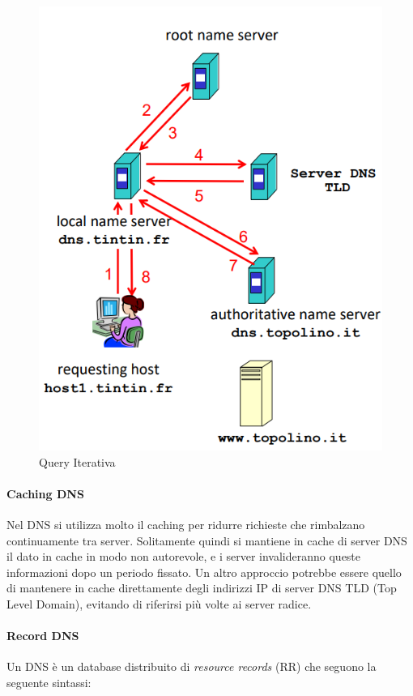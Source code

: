 \documentclass{article}
\begin{document}
\begin{figure}[htbp]
\begin{minipage}{0.37\textwidth}
        \includegraphics[width=\linewidth]{img/queryIterativa.png}
        \caption{Query Iterativa}
    \end{minipage}
\end{figure}

\newpage

\paragraph{Caching DNS} Nel DNS si utilizza molto il caching per ridurre richieste che rimbalzano continuamente tra server. Solitamente quindi si mantiene in cache di server DNS il dato in cache in modo non autorevole, e i server invalideranno queste informazioni dopo un periodo fissato. Un altro approccio potrebbe essere quello di mantenere in cache direttamente degli indirizzi 
IP di server DNS TLD (Top Level Domain), evitando di riferirsi più volte ai server radice.

\paragraph{Record DNS} Un DNS è un database distribuito di \textit{resource records} (RR) che seguono la seguente sintassi:
\end{document}
